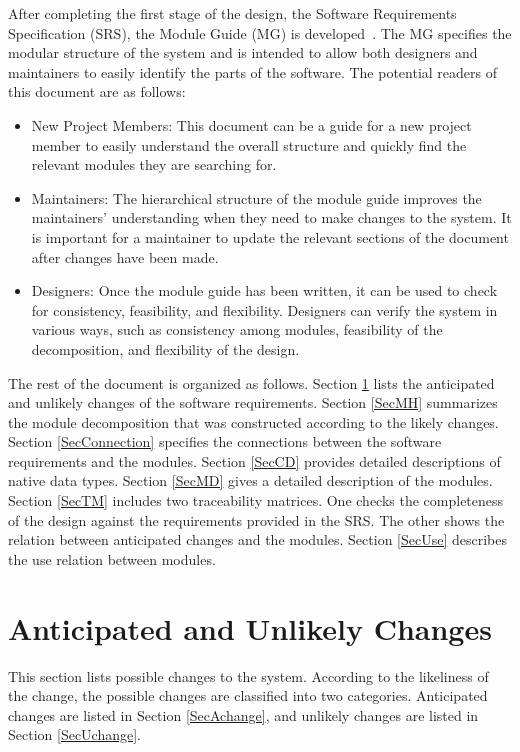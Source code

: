\documentclass[12pt, titlepage]{article}
\begin{document}
After completing the first stage of the design, the Software Requirements
Specification (SRS), the Module Guide (MG) is developed~\citep{ParnasEtAl1984}. The MG
specifies the modular structure of the system and is intended to allow both
designers and maintainers to easily identify the parts of the software.  The
potential readers of this document are as follows:

\begin{itemize}
\item New Project Members: This document can be a guide for a new project member
  to easily understand the overall structure and quickly find the
  relevant modules they are searching for.
\item Maintainers: The hierarchical structure of the module guide improves the
  maintainers' understanding when they need to make changes to the system. It is
  important for a maintainer to update the relevant sections of the document
  after changes have been made.
\item Designers: Once the module guide has been written, it can be used to
  check for consistency, feasibility, and flexibility. Designers can verify the
  system in various ways, such as consistency among modules, feasibility of the
  decomposition, and flexibility of the design.
\end{itemize}

The rest of the document is organized as follows. Section
\ref{SecChange} lists the anticipated and unlikely changes of the software
requirements. Section \ref{SecMH} summarizes the module decomposition that
was constructed according to the likely changes. Section \ref{SecConnection}
specifies the connections between the software requirements and the
modules. Section \ref{SecCD} provides detailed descriptions of native data types. Section \ref{SecMD} gives a detailed description of the
modules. Section \ref{SecTM} includes two traceability matrices. One checks
the completeness of the design against the requirements provided in the SRS. The
other shows the relation between anticipated changes and the modules. Section
\ref{SecUse} describes the use relation between modules.

\section{Anticipated and Unlikely Changes} \label{SecChange}

This section lists possible changes to the system. According to the likeliness
of the change, the possible changes are classified into two
categories. Anticipated changes are listed in Section \ref{SecAchange}, and
unlikely changes are listed in Section \ref{SecUchange}.
\end{document}
